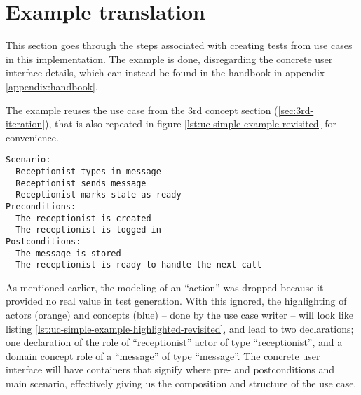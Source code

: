 \section{Example translation}
This section goes through the steps associated with creating tests from use cases in this implementation. The example is done, disregarding the concrete user interface details, which can instead be found in the handbook in appendix \ref{appendix:handbook}.\medskip

\noindent The example reuses the use case from the 3rd concept section (\ref{sec:3rd-iteration}), that is also repeated in figure \ref{lst:uc-simple-example-revisited} for convenience.

\begin{lstlisting}[frame=single,style=usecase, caption=Use case example revisited, label=lst:uc-simple-example-revisited]
Scenario:
  Receptionist types in message
  Receptionist sends message
  Receptionist marks state as ready 
Preconditions:
  The receptionist is created
  The receptionist is logged in
Postconditions:
  The message is stored
  The receptionist is ready to handle the next call
\end{lstlisting}
As mentioned earlier, the modeling of an ``action'' was dropped because it provided no real value in test generation. With this ignored, the highlighting of actors (orange) and concepts (blue) -- done by the use case writer -- will look like listing \ref{lst:uc-simple-example-highlighted-revisited}, and lead to two declarations; one declaration of the role of ``receptionist'' actor of type ``receptionist'', and a domain concept role of a ``message'' of type ``message''. The concrete user interface will have containers that signify where pre- and postconditions and main scenario, effectively giving us the composition and structure of the use case.

